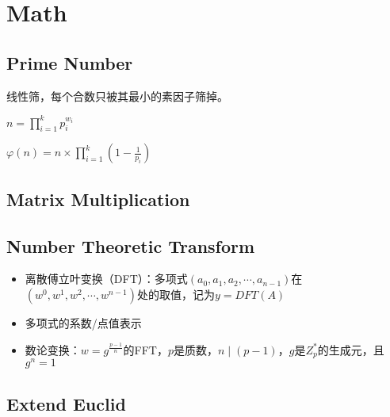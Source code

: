 \section{Math}
	\subsection{Prime Number}
		\begin{flushleft}
			线性筛，每个合数只被其最小的素因子筛掉。

			$n = \prod_{i = 1}^{k} p_{i}^{w_{i}}$

			$\varphi(n)=n \times \prod_{i=1}^{k}(1 - \frac{1}{p_{i}})$
		\end{flushleft}
		
	\subsection{Matrix Multiplication}
		
	\subsection{Number Theoretic Transform}
		\begin{itemize}
			\item
			离散傅立叶变换（DFT）：多项式$(a_0, a_1, a_2,\cdots,a_{n-1})$在$(w^0, w^1,w^2,\cdots,w^{n-1})$处的取值，记为$y=DFT(A)$
			\item
			多项式的系数/点值表示
			\item
			数论变换：$w=g^{\frac{p-1}{n}}$的FFT，$p$是质数，$n\mid(p-1)$，$g$是$Z_p^*$的生成元，且$g^n=1$
		\end{itemize}
		
	\subsection{Extend Euclid}
		
